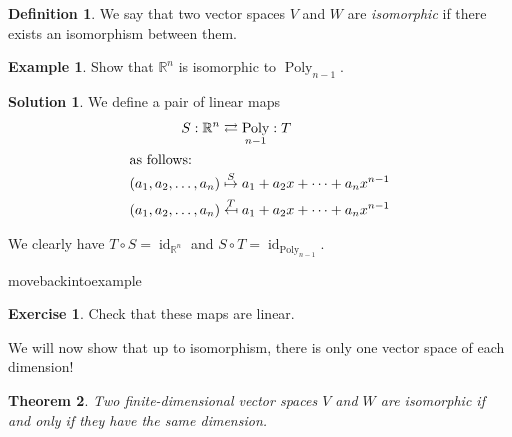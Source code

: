 \documentclass[a4paper,11pt]{book}
\newtheorem{theorem}{Theorem}
\theoremstyle{definition}
\newtheorem{definition}[theorem]{Definition}
\newtheorem{exercise}{Exercise}
\newtheorem{example_environment}{Example}[chapter]
\newtheorem*{solution}{Solution}
\newenvironment{example}
	{
		\begin{oframed} 
		\begin{example_environment}
	}
	{
		\end{example_environment}
		\end{oframed}
	}
\DeclareMathOperator{\Poly}{Poly}
\DeclareMathOperator{\id}{id}
\begin{document}
\begin{definition} We say that two vector spaces $V$ and $W$ are {\em isomorphic} if there exists an isomorphism between them.
\end{definition}

\begin{example} Show that $\mathbb{R}^n$ is isomorphic to $\Poly_{n-1}$.
\begin{solution} We define a pair of linear maps
\begin{align*}
 S : \mathbb{R}^n & \rightleftarrows \Poly_{n-1} : T \\
\intertext{as follows:}
 (a_1, a_2, \ldots, a_n) & \stackrel{S}{\mapsto} a_1 + a_2 x + \cdots + a_n x^{n-1} \\
 (a_1, a_2, \ldots, a_n) & \stackrel{T}{\mapsfrom} a_1 + a_2 x + \cdots + a_n x^{n-1} 
\end{align*}
\end{solution}

We clearly have $T \circ S = \id_{\mathbb{R}^n}$ and $S \circ T = \id_{\Poly_{n-1}}$.
\end{example}movebackintoexample
\begin{exercise} Check that these maps are linear.
\end{exercise}
We will now show that up to isomorphism, there is only one vector space of each dimension!
\begin{theorem} Two finite-dimensional vector spaces $V$ and $W$ are isomorphic if and only if they have the same dimension.
\end{theorem}
\end{document}
